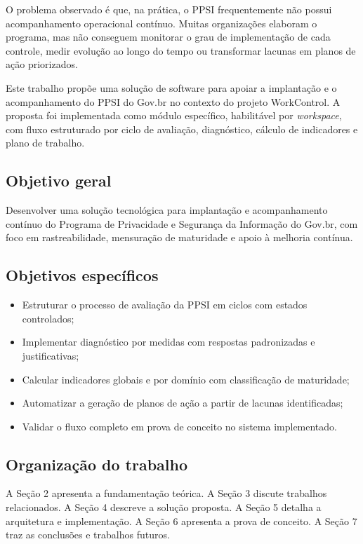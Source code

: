 \documentclass[12pt]{article}
\begin{document}
O problema observado é que, na prática, o PPSI frequentemente não possui acompanhamento operacional contínuo. Muitas organizações elaboram o programa, mas não conseguem monitorar o grau de implementação de cada controle, medir evolução ao longo do tempo ou transformar lacunas em planos de ação priorizados.

Este trabalho propõe uma solução de software para apoiar a implantação e o acompanhamento do PPSI do Gov.br no contexto do projeto WorkControl. A proposta foi implementada como módulo específico, habilitável por \textit{workspace}, com fluxo estruturado por ciclo de avaliação, diagnóstico, cálculo de indicadores e plano de trabalho.

\subsection{Objetivo geral}

Desenvolver uma solução tecnológica para implantação e acompanhamento contínuo do Programa de Privacidade e Segurança da Informação do Gov.br, com foco em rastreabilidade, mensuração de maturidade e apoio à melhoria contínua.

\subsection{Objetivos específicos}

\begin{itemize}
    \item Estruturar o processo de avaliação da PPSI em ciclos com estados controlados;
    \item Implementar diagnóstico por medidas com respostas padronizadas e justificativas;
    \item Calcular indicadores globais e por domínio com classificação de maturidade;
    \item Automatizar a geração de planos de ação a partir de lacunas identificadas;
    \item Validar o fluxo completo em prova de conceito no sistema implementado.
\end{itemize}

\subsection{Organização do trabalho}

A Seção 2 apresenta a fundamentação teórica. A Seção 3 discute trabalhos relacionados. A Seção 4 descreve a solução proposta. A Seção 5 detalha a arquitetura e implementação. A Seção 6 apresenta a prova de conceito. A Seção 7 traz as conclusões e trabalhos futuros.
\end{document}
